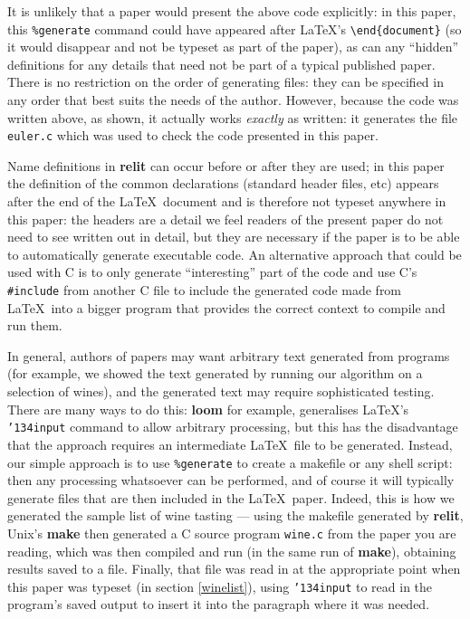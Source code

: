 \documentclass[12pt]{article}
\def\name#1{\textbf{#1}}
\begin{document}
It is unlikely that a paper would present the above code explicitly: in this paper, this \texttt{\%{}generate} command could have appeared after \LaTeX's \verb|\end{document}| (so it would disappear and not be typeset as part of the paper), as can any ``hidden'' definitions for any details that need not be part of a typical published paper. There is no restriction on the order of generating files: they can be specified in any order that best suits the needs of the author. However, because the code was written above, as shown, it actually works \emph{exactly\/} as written: it generates the file \texttt{euler.c} which was used to check the code presented in this paper. 

Name definitions in \name{relit} can occur before or after they are used; in this paper the definition of the common declarations (standard header files, etc) appears after the end of the \LaTeX\ document and is therefore not typeset anywhere in this paper: the headers are a detail we feel readers of the present paper do not need to see written out in detail, but they are necessary if the paper is to be able to automatically generate executable code. An alternative approach that could be used with C is to only generate ``interesting'' part of the code and use C's \texttt{\#include} from another C file to include the generated code made from \LaTeX\ into a bigger program that provides the correct context to compile and run them.

In general, authors of papers may want arbitrary text generated from programs (for example, we showed the text generated by running our algorithm on a selection of wines), and the generated text may require sophisticated testing. There are many ways to do this: \name{loom} for example, generalises \LaTeX's \texttt{\char'134input} command to allow arbitrary processing, but this has the disadvantage that the approach requires an intermediate \LaTeX\ file to be generated. Instead, our simple approach is to use \texttt{\%{}generate} to create a makefile or any shell script: then any processing whatsoever can be performed, and of course it will typically generate files that are then included in the \LaTeX\ paper. Indeed, this is how we generated the sample list of wine tasting --- using the makefile generated by \name{relit}, Unix's \name{make} then generated a C source program \texttt{wine.c} from the paper you are reading, which was then compiled and run (in the same run of \name{make}), obtaining results saved to a file. Finally, that file was read in at the appropriate point when this paper was typeset (in section \ref{winelist}), using \texttt{\char'134input} to read in the program's saved output to insert it into the paragraph where it was needed. 
\end{document}
